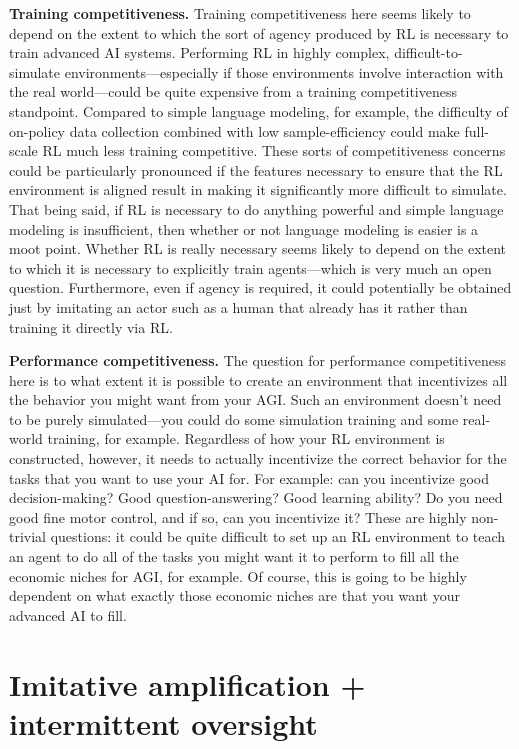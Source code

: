 \documentclass[
  onecolumn,
  natbib,
]{miri-tech-article}
\begin{document}
\textbf{Training competitiveness.} Training competitiveness here seems likely to depend on the extent to which the sort of agency produced by RL is necessary to train advanced AI systems. Performing RL in highly complex, difficult-to-simulate environments---especially if those environments involve interaction with the real world---could be quite expensive from a training competitiveness standpoint. Compared to simple language modeling, for example, the difficulty of on-policy data collection combined with low sample-efficiency could make full-scale RL much less training competitive. These sorts of competitiveness concerns could be particularly pronounced if the features necessary to ensure that the RL environment is aligned result in making it significantly more difficult to simulate. That being said, if RL is necessary to do anything powerful and simple language modeling is insufficient, then whether or not language modeling is easier is a moot point. Whether RL is really necessary seems likely to depend on the extent to which it is necessary to explicitly train agents---which is very much an open question. Furthermore, even if agency is required, it could potentially be obtained just by imitating an actor such as a human that already has it rather than training it directly via RL.

\textbf{Performance competitiveness.} The question for performance competitiveness here is to what extent it is possible to create an environment that incentivizes all the behavior you might want from your AGI. Such an environment doesn't need to be purely simulated---you could do some simulation training and some real-world training, for example. Regardless of how your RL environment is constructed, however, it needs to actually incentivize the correct behavior for the tasks that you want to use your AI for. For example: can you incentivize good decision-making? Good question-answering? Good learning ability? Do you need good fine motor control, and if so, can you incentivize it? These are highly non-trivial questions: it could be quite difficult to set up an RL environment to teach an agent to do all of the tasks you might want it to perform to fill all the economic niches for AGI, for example. Of course, this is going to be highly dependent on what exactly those economic niches are that you want your advanced AI to fill.

\section{Imitative amplification + intermittent oversight}
\label{sec:2}
\end{document}

